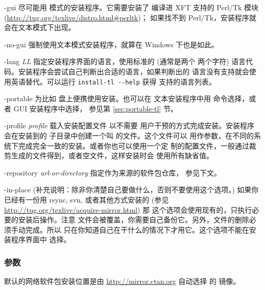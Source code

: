 \documentclass{article}
\begin{document}
\begin{ttdescription}
\item[-gui] 尽可能用 \GUI{} 模式的安装程序。它需要安装了
  编译进 XFT 支持的 Perl/Tk 模块
  (\url{http://tug.org/texlive/distro.html#perltk})；
  如果找不到 Perl/Tk，安装程序就会在文本模式下出现。

\item[-no-gui] 强制使用文本模式安装程序，就算在 Windows 下也是如此。

\item[-lang {\sl LL}] 指定安装程序界面的语言，使用标准的 (通常是两个
两个字符) 语言代码。安装程序会尝试自己判断出合适的语言，如果判断出的
语言没有支持就会使用英语替代。可以运行 \verb|install-tl --help| 获得
支持的语言列表。

\item[-portable] 为比如 \USB{} 盘上便携使用安装。也可以在
文本安装程序中用  命令选择，或者 GUI 安装程序中选择，
参见第 \ref{sec:portable-tl} 节。

\item[-profile {\sl profile}] 载入安装配置文件  以不需要
用户干预的方式完成安装。安装程序会在安装到的 
子目录中创建一个叫  的文件。这个文件可以
用作参数，在不同的系统下完成完全一致的安装。或者你也可以使用一个定
制的配置文件，一般通过裁剪生成的文件得到，或者空文件，这样安装时会
使用所有缺省值。

\item [-repository {\sl url-or-directory}] 指定作为来源的软件包仓库，
参见下文。

\item[-in-place] (补充说明：除非你清楚自己要做什么，否则不要使用这个选项。)
如果你已经有一份用 rsync, svn, 或者其他方式安装的
\TL{} (参见 \url{http://tug.org/texlive/acquire-mirror.html}) 那
这个选项会使用现有的，只执行必要的安装后操作。注意 
文件会被覆盖，你需要自己备份它。另外，文件的删除必须手动完成。所以
只在你知道自己在干什么的情况下才用它。这个选项不能在安装程序界面中
选择。

\end{ttdescription}

\subsubsection{ 参数}
\label{sec:location}

默认的网络软件包安装位置是由 \url{http://mirror.ctan.org} 自动选择
的 \CTAN{} 镜像。
\end{document}
